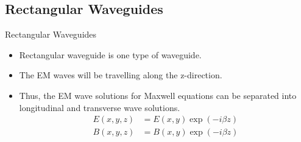\documentclass[12pt, dvipsnames]{beamer}
\begin{document}
\subsection{Rectangular Waveguides}
\begin{frame}{Rectangular Waveguides}
    \begin{itemize}
        \item Rectangular waveguide is one type of waveguide.
        \item The EM waves will be travelling along the z-direction.
        \item Thus, the EM wave solutions for Maxwell equations can be separated into longitudinal and transverse wave solutions.
        \begin{align*}
            E(x,y,z)&=E(x,y)\exp(-i\beta z) \\
            B(x,y,z)&=B(x,y)\exp(-i\beta z)
        \end{align*}
    \end{itemize}
\end{frame}
\end{document}
